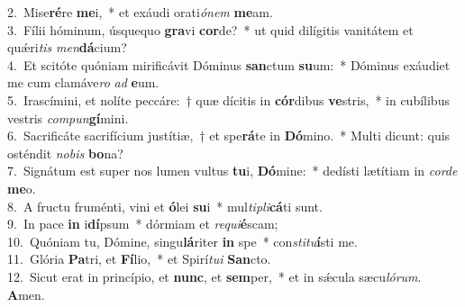 {2.~}Mise\textbf{ré}re \textbf{me}i,~* et exáudi orati\textit{ó}\textit{nem} \textbf{me}am.\\
{3.~}Fílii hóminum, úsquequo \textbf{gra}vi \textbf{cor}de?~* ut quid dilígitis vanitátem et quǽri\textit{tis} \textit{men}\textbf{dá}cium?\\
{4.~}Et scitóte quóniam mirificávit Dóminus \textbf{san}ctum \textbf{su}um:~* Dóminus exáudiet me cum clamáve\textit{ro} \textit{ad} \textbf{e}um.\\
{5.~}Irascímini, et nolíte peccáre:~† quæ dícitis in \textbf{cór}dibus \textbf{ve}stris,~* in cubílibus vestris \textit{com}\textit{pun}\textbf{gí}mini.\\
{6.~}Sacrificáte sacrifícium justítiæ,~† et spe\textbf{rá}te in \textbf{Dó}mino.~* Multi dicunt: quis osténdit \textit{no}\textit{bis} \textbf{bo}na?\\
{7.~}Signátum est super nos lumen vultus \textbf{tu}i, \textbf{Dó}mine:~* dedísti lætítiam in \textit{cor}\textit{de} \textbf{me}o.\\
{8.~}A fructu fruménti, vini et \textbf{ó}lei \textbf{su}i~* mul\textit{ti}\textit{pli}\textbf{cá}ti sunt.\\
{9.~}In pace \textbf{in} i\textbf{dí}psum~* dórmiam et \textit{re}\textit{qui}\textbf{é}scam;\\
{10.~}Quóniam tu, Dómine, singu\textbf{lá}riter \textbf{in} spe~* con\textit{sti}\textit{tu}\textbf{í}sti me.\\
{11.~}Glória \textbf{Pa}tri, et \textbf{Fí}lio,~* et Spirí\textit{tu}\textit{i} \textbf{San}cto.\\
{12.~}Sicut erat in princípio, et \textbf{nunc}, et \textbf{sem}per,~* et in sǽcula sæcu\textit{ló}\textit{rum}. \textbf{A}men.\\
